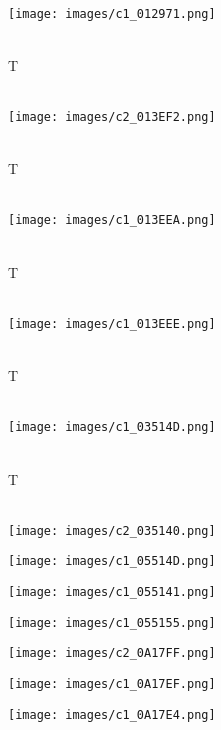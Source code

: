\documentclass {article}
\begin{document}
\\
\begin{centering} \texttt{[image: images/c1\_012971.png]} \end{centering}
\\
T
\\
\\
\begin{centering} \texttt{[image: images/c2\_013EF2.png]} \end{centering}
\\
T
\\
\\
\begin{centering} \texttt{[image: images/c1\_013EEA.png]} \end{centering}
\\
T
\\
\\
\begin{centering} \texttt{[image: images/c1\_013EEE.png]} \end{centering}
\\
T
\\
\\
\begin{centering} \texttt{[image: images/c1\_03514D.png]} \end{centering}
\\
T
\\
\\
\begin{centering} \texttt{[image: images/c2\_035140.png]} \end{centering}
\begin{centering} \texttt{[image: images/c1\_05514D.png]} \end{centering}
\begin{centering} \texttt{[image: images/c1\_055141.png]} \end{centering}
\begin{centering} \texttt{[image: images/c1\_055155.png]} \end{centering}
\begin{centering} \texttt{[image: images/c2\_0A17FF.png]} \end{centering}
\begin{centering} \texttt{[image: images/c1\_0A17EF.png]} \end{centering}
\begin{centering} \texttt{[image: images/c1\_0A17E4.png]} \end{centering}
\end{document}
